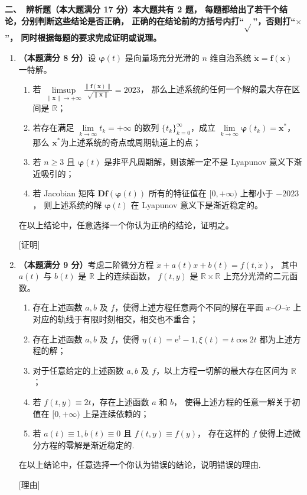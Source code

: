 \textbf{二、\ 辨析题（本大题满分 17 分）本大题共有 2 题，
每题都给出了若干个结论，分别判断这些结论是否正确，
正确的在结论前的方括号内打``$\sqrt{ }$''，否则打``$\times$''，
同时根据每题的要求完成证明或说理。}
\begin{enumerate}
\item \textbf{（本题满分 8 分）}设 $\boldsymbol{\varphi}(t)$ 是向量场充分光滑的 $n$ 维自治系统 $\dot{\boldsymbol{x}}=\boldsymbol{f}(\boldsymbol{x})$ 一特解。
\begin{enumerate}[label=$【\qquad】$]
\item 若 $\limsup\limits_{\|\boldsymbol{x}\| \rightarrow+\infty} \frac{\|\boldsymbol{f}(\boldsymbol{x})\|}{\sqrt{\|\boldsymbol{x}\|}}=2023$，
那么上述系统的任何一个解的最大存在区间是 $\mathbb{R}$；
\item 若存在满足 $\lim\limits_{k \rightarrow \infty} t_{k}=+\infty$ 的数列 $\{t_{k}\}_{k=0}^{\infty}$，成立 $\lim\limits_{k \rightarrow \infty} \boldsymbol{\varphi}(t_{k})=\boldsymbol{x}^{*}$，
那么 $\boldsymbol{x}^{*}$为上述系统的奇点或周期轨道上的点；
\item 若 $n \geq 3$ 且 $\boldsymbol{\varphi}(t)$ 是非平凡周期解，则该解一定不是 Lyapunov 意义下渐近吸引的；
\item 若 Jacobian 矩阵 $\boldsymbol{D} \boldsymbol{f}(\boldsymbol{\varphi}(t))$ 所有的特征值在 $[0,+\infty)$ 上都小于 $-2023$，
则上述系统的解 $\boldsymbol{\varphi}(t)$ 在 Lyapunov 意义下是渐近稳定的。
\end{enumerate}
在以上结论中，任意选择一个你认为正确的结论，证明之。

[证明]

\item \textbf{（本题满分 9 分）}考虑二阶微分方程 $\ddot{x}+a(t) x+b(t)=f(t, \dot{x})$，
其中 $a(t)$ 与 $b(t)$ 是 $\mathbb{R}$ 上的连续函数，
$f(t, y)$ 是 $\mathbb{R} \times \mathbb{R}$ 上充分光滑的二元函数。
\begin{enumerate}[label=$【\qquad】$]
\item 存在上述函数 $a, b$ 及 $f$，使得上述方程任意两个不同的解在平面 $x$--$O$--$\dot{x}$ 上对应的轨线于有限时刻相交，相交也不重合；
\item 存在上述函数 $a, b$ 及 $f$，使得 $\eta(t)=\mathrm{e}^{t}-1, \xi(t)=t \cos 2 t$ 都为上述方程的解；
\item 对于任意给定的上述函数 $a, b$ 及 $f$，以上方程一切解的最大存在区间为 $\mathbb{R}$；
\item 若 $f(t, y) \equiv 2 t$，存在上述函数 $a$ 和 $b$，
使得上述方程的任意一解关于初值在 $[0,+\infty)$ 上是连续依赖的；
\item 若 $a(t) \equiv 1, b(t) \equiv 0$ 且 $f(t, y) \equiv f(y)$，
存在这样的 $f$ 使得上述微分方程的零解是渐近稳定的.
\end{enumerate}
在以上结论中，任意选择一个你认为错误的结论，说明错误的理由.

[理由]
\end{enumerate}

